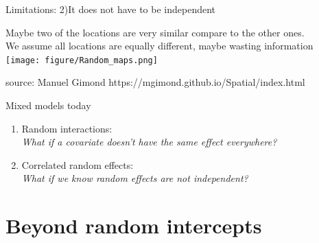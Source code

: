 \documentclass{beamer}
\begin{document}
\begin{frame}{Limitations: 2)It does not have to be independent}
      
      Maybe two of the locations are very similar compare to the other ones.\\
      We assume all locations are equally different, maybe wasting information\\
      
  \centering    
      \texttt{[image: figure/Random\_maps.png]}
      
      source: Manuel Gimond https://mgimond.github.io/Spatial/index.html
 
\end{frame}

\begin{frame}{Mixed models today}
 
 \begin{enumerate}
 \large
    \item Random interactions: \\ \textit{What if a covariate doesn't have the same effect everywhere?}
     \item Correlated random effects:\\ \textit{What if we know random effects are not independent?}
 \end{enumerate}
 

\end{frame}

\section{Beyond random intercepts}
\end{document}

